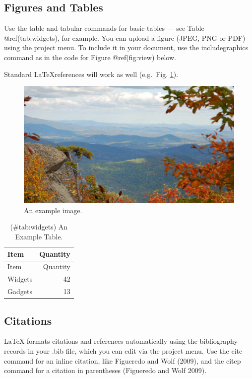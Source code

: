 \documentclass[fleqn,10pt,lineno]{wlpeerj} %
\begin{document}
\hypertarget{figures-and-tables}{%
\subsection*{Figures and Tables}\label{figures-and-tables}}

Use the table and tabular commands for basic tables --- see Table
@ref(tab:widgets), for example. You can upload a figure (JPEG, PNG or
PDF) using the project menu. To include it in your document, use the
includegraphics command as in the code for Figure @ref(fig:view) below.

Standard \LaTeX references will work as well (e.g.~Fig. \ref{fig:view}).

\begin{figure}
\includegraphics[width=1\linewidth]{view} \caption{An example image.}\label{fig:view}
\end{figure}

\begin{longtable}[]{@{}lr@{}}
\caption{(\#tab:widgets) An Example Table.}\tabularnewline
\toprule
Item & Quantity\tabularnewline
\midrule
\endfirsthead
\toprule
Item & Quantity\tabularnewline
\midrule
\endhead
Widgets & 42\tabularnewline
Gadgets & 13\tabularnewline
\bottomrule
\end{longtable}

\hypertarget{citations}{%
\subsection*{Citations}\label{citations}}

LaTeX formats citations and references automatically using the
bibliography records in your .bib file, which you can edit via the
project menu. Use the cite command for an inline citation, like
Figueredo and Wolf (2009), and the citep command for a citation in
parentheses (Figueredo and Wolf 2009).
\end{document}
